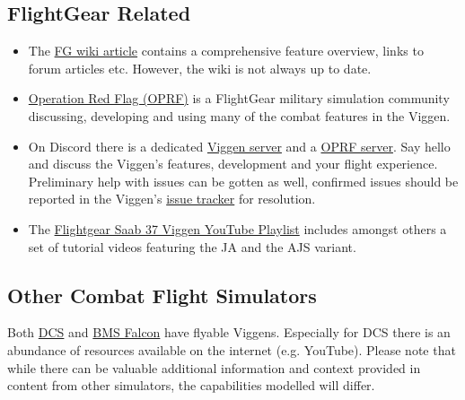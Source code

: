 \documentclass[a4paper]{report}
\begin{document}
\subsection{FlightGear Related}
\begin{itemize}
\item The \href{http://wiki.flightgear.org/Saab_37_Viggen}{FG wiki article} contains a comprehensive feature overview, links to forum articles etc. However, the wiki is not always up to date.
\item \href{http://opredflag.com/}{Operation Red Flag (OPRF)} is a FlightGear military simulation community discussing, developing and using many of the combat features in the Viggen.
\item On Discord there is a dedicated \href{https://discord.gg/jc5pSM5}{Viggen server} and a \href{https://discord.gg/SmGFnJN}{OPRF server}. Say hello and discuss the Viggen's features, development and your flight experience. Preliminary help with issues can be gotten as well, confirmed issues should be reported in the Viggen's \href{https://github.com/NikolaiVChr/flightgear-saab-ja-37-viggen/issues}{issue tracker} for resolution.
\item The \href{https://www.youtube.com/playlist?list=PLogi97V-ki0GfCLqimTtIq9RIVcm-GRFE}{Flightgear Saab 37 Viggen YouTube Playlist} includes amongst others a set of tutorial videos featuring the JA and the AJS variant.
\end{itemize}

\subsection{Other Combat Flight Simulators}
Both \href{https://www.digitalcombatsimulator.com/en/index.php}{DCS} and \href{https://www.benchmarksims.org/}{BMS Falcon} have flyable Viggens. Especially for DCS there is an abundance of resources available on the internet (e.g. YouTube). Please note that while there can be valuable additional information and context provided in content from other simulators, the capabilities modelled will differ.
\end{document}
